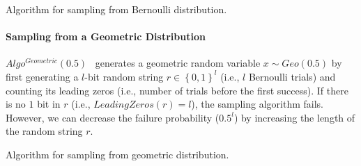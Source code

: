 \begin{algorithm}[tbh!]
    \centering
    \caption{Algorithm for sampling from Bernoulli distribution.}
    \label{algo:Bernoulli}
\end{algorithm}
\FloatBarrier

\paragraph{Sampling from a Geometric Distribution}
$Algo^{Geometric}\left(0.5\right)$~\cite{walker1974fast, googleDP2019} generates a geometric random variable $x\sim Geo\left(0.5\right) $ by first generating a $l$-bit random string $r\in \left\{0,1\right\}^l $ (i.e., $l$ Bernoulli trials) and counting its leading zeros (i.e., number of trials before the first success). If there is no $1$ bit in $r$ (i.e., $ LeadingZeros(r)=l$), the sampling algorithm fails. However, we can decrease the failure probability ($0.5^{l}$) by increasing the length of the random string $r$.

\begin{algorithm}[tbh!]
    \centering
    \caption{Algorithm for sampling from geometric distribution.}
    \label{algo:Geometric}
\end{algorithm}
\FloatBarrier

